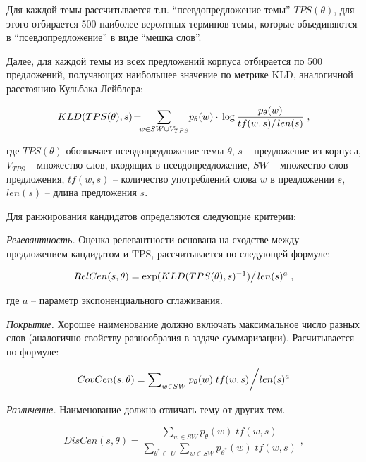 Для каждой темы рассчитывается т.н. ``псевдопредложение темы'' $TPS(\theta)$, для этого отбирается 500 наиболее вероятных терминов темы, которые объединяются в ``псевдопредложение'' в виде ``мешка слов''.

Далее, для каждой темы из всех предложений корпуса отбирается по 500 предложений, получающих наибольшее значение по метрике KLD, аналогичной расстоянию Кульбака-Лейблера:

\[ KLD(TPS(\theta),s)\!=\! \!\! \sum \limits _{w\in SW\cup V_{TPS}}\! {p_{\theta } (w)} \cdot \,\log \frac {p_{\theta } (w)}{tf(w,s) \mathord {\left /{ {\vphantom {tf(w,s) {len(s)}}} }\right. } {len(s)}} \;,  \]

\noindent где $TPS(\theta)$ обозначает псевдопредложение темы $\theta$, $s$ -- предложение из корпуса, $V_{TPS}$ -- множество слов, входящих в псевдопредложение, $SW$ -- множество слов предложения, $tf(w, s)$ -- количество употреблений слова $w$ в предложении $s$, $len(s)$ -- длина предложения $s$.

Для ранжирования кандидатов определяются следующие критерии:

\textit{Релевантность.} Оценка релевантности основана на сходстве между предложением-кандидатом и TPS, рассчитывается по следующей формуле:

\begin{equation*} RelCen(s,\theta)={\exp (KLD(TPS(\theta),s)^{-1})} \mathord {\left /{ {\vphantom {{\exp (KLD(TPS(\theta),s)^{-1})} {len(s)^{a}}}} }\right. } {len(s)^{a}} \;,\end{equation*}

\noindent где $a$ -- параметр экспоненциального сглаживания.

\textit{Покрытие.} Хорошее наименование должно включать максимальное число разных слов (аналогично свойству разнообразия в задаче суммаризации). Расчитывается по формуле:

\begin{equation*} CovCen(s,\theta)={\sum \nolimits _{w\in SW} {p_{\theta }} (w)\;tf(w,s)} \mathord {\bigg /{ {\vphantom {{\sum \nolimits _{w\in SW} {p_{\theta }} (w)\;tf(w,s)} {len(s)^{a}}}} } } {len(s)^{a}}\end{equation*}

\textit{Различение.} Наименование должно отличать тему от других тем.

\begin{equation*} DisCen(s,\theta)=\frac {\sum \nolimits _{w\in SW} {p_{\theta }} (w)\;tf(w,s)}{\sum \nolimits _{\theta ^{\ast }\in \;U} {\sum \nolimits _{w\in SW} {p_{\theta ^{\ast }}} (w)\;tf(w,s)}} \;,\end{equation*}

